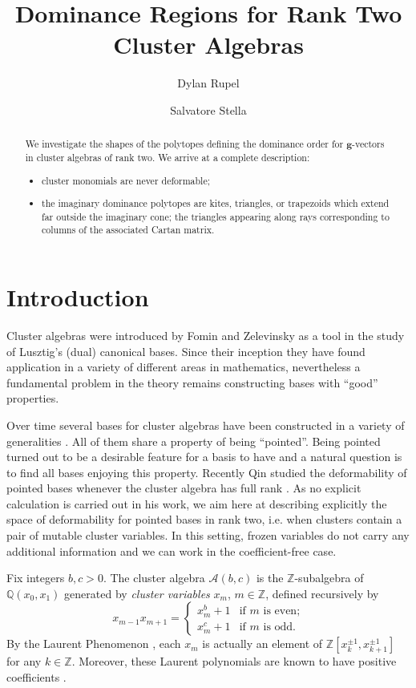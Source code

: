 \documentclass{amsart}
\title{Dominance Regions for Rank Two Cluster Algebras}
\author{Dylan Rupel}
\author{Salvatore Stella}
\numberwithin{theorem}{section}
\newcommand{\bfg}{\boldsymbol{g}}
\newcommand{\cA}{\mathcal{A}}
\newcommand{\QQ}{\mathbb{Q}}
\newcommand{\ZZ}{\mathbb{Z}}
\begin{document}
  \begin{abstract}
    We investigate the shapes of the polytopes defining the dominance order for $\bfg$-vectors in cluster algebras of rank two.
    We arrive at a complete description: 
    \begin{itemize}
      \item cluster monomials are never deformable;
      \item the imaginary dominance polytopes are kites, triangles, or trapezoids which extend far outside the imaginary cone; the triangles appearing along rays corresponding to columns of the associated Cartan matrix.
    \end{itemize}
  \end{abstract}
  \maketitle

  \section{Introduction}
  Cluster algebras were introduced by Fomin and Zelevinsky as a tool in the study of Lusztig's (dual) canonical bases.
  Since their inception they have found application in a variety of different areas in mathematics, nevertheless a fundamental problem in the theory remains constructing bases with ``good'' properties. 
  
  Over time several bases for cluster algebras have been constructed in a variety of generalities \cite{foo,bar,baz}. 
  All of them share a property of being ``pointed''.
  Being pointed turned out to be a desirable feature for a basis to have and a natural question is to find all bases enjoying this property.
  Recently Qin studied the deformability of pointed bases whenever the cluster algebra has full rank \cite{qin}. 
  As no explicit calculation is carried out in his work, we aim here at describing explicitly the space of deformability for pointed bases in rank two, i.e. when clusters contain a pair of mutable cluster variables.
  In this setting, frozen variables do not carry any additional information and we can work in the coefficient-free case. 

  Fix integers $b,c>0$.  The cluster algebra $\cA(b,c)$ is the $\ZZ$-subalgebra of $\QQ(x_0,x_1)$ generated by \emph{cluster variables} $x_m$, $m\in\ZZ$, defined recursively by
  \begin{equation}
    x_{m-1}x_{m+1}=\begin{cases} x_m^b+1 & \text{if $m$ is even;}\\ x_m^c+1 & \text{if $m$ is odd.} \end{cases}
  \end{equation}
  By the Laurent Phenomenon \cite{fomin-zelevinsky}, each $x_m$ is actually an element of $\ZZ[x_k^{\pm1},x_{k+1}^{\pm1}]$ for any $k\in\ZZ$.
  Moreover, these Laurent polynomials are known to have positive coefficients \cite{LLZ,lee-schiffler,GHKK}.
\end{document}
